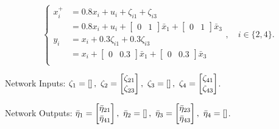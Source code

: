 \begin{equation*}
\begin{cases}
    x_i^+ &= 0.8 x_i + u_i + \zeta_{i1} + \zeta_{i3}\\
    & = 0.8 x_i + u_i + \begin{bmatrix} 0 & 1 \end{bmatrix} \bar{x}_1 + \begin{bmatrix} 0 & 1 \end{bmatrix} \bar{x}_3 \\
    y_i &= x_i + 0.3 \zeta_{i1} + 0.3 \zeta_{i3}\\
    & = x_i + \begin{bmatrix} 0 & 0.3 \end{bmatrix} \bar{x}_1 + \begin{bmatrix} 0 & 0.3  \end{bmatrix} \bar{x}_3 \\
\end{cases},\quad i \in \{2,4\}.
\end{equation*}

Network Inputs: \(\zeta_1 = \left[\empty\right],\ \zeta_2 = \begin{bmatrix} \zeta_{21} \\ \zeta_{23}\end{bmatrix},\ \zeta_3 = \left[\empty\right],\ 
\zeta_4 = \begin{bmatrix} \zeta_{41} \\ \zeta_{43}\end{bmatrix}\).

Network Outputs: \(\bar{\eta}_1 = \begin{bmatrix} \bar{\eta}_{21} \\ \bar{\eta}_{41}
\end{bmatrix},\ \bar{\eta}_2 = \left[\empty\right],\ \bar{\eta}_3 = \begin{bmatrix} \bar{\eta}_{23} \\ \bar{\eta}_{43} \end{bmatrix}, \ \bar{\eta}_4 = \left[\empty\right]\).

